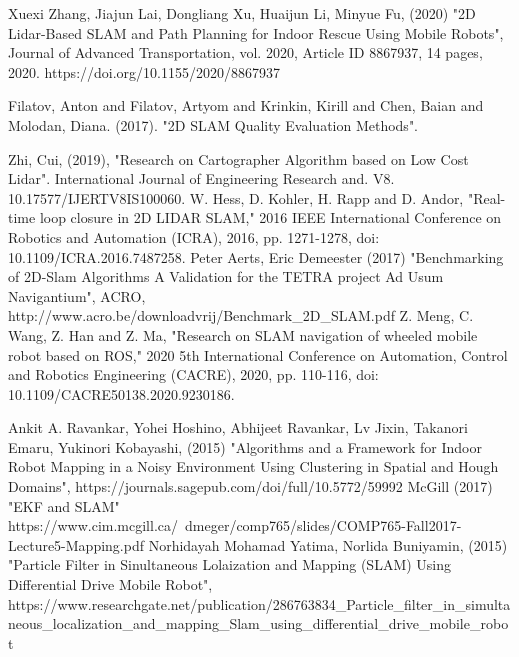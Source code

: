 \documentclass[12pt, a4paper, onecolumn]{article}
\begin{document}
\newpage
\begin{thebibliography}{9}
Xuexi Zhang, Jiajun Lai, Dongliang Xu, Huaijun Li, Minyue Fu, (2020) "2D Lidar-Based SLAM and Path Planning for Indoor Rescue Using Mobile Robots", Journal of Advanced Transportation, vol. 2020, Article ID 8867937, 14 pages, 2020. https://doi.org/10.1155/2020/8867937

Filatov, Anton and Filatov, Artyom and Krinkin, Kirill and Chen, Baian and Molodan, Diana. (2017). "2D SLAM Quality Evaluation Methods". 

Zhi, Cui, (2019), "Research on Cartographer Algorithm based on Low Cost Lidar". International Journal of Engineering Research and. V8. 10.17577/IJERTV8IS100060. 
W. Hess, D. Kohler, H. Rapp and D. Andor, "Real-time loop closure in 2D LIDAR SLAM," 2016 IEEE International Conference on Robotics and Automation (ICRA), 2016, pp. 1271-1278, doi: 10.1109/ICRA.2016.7487258.
Peter Aerts, Eric Demeester (2017) "Benchmarking of 2D-Slam Algorithms
A Validation for the TETRA project Ad Usum Navigantium", ACRO, http://www.acro.be/downloadvrij/Benchmark{\_}2D{\_}SLAM.pdf
Z. Meng, C. Wang, Z. Han and Z. Ma, "Research on SLAM navigation of wheeled mobile robot based on ROS," 2020 5th International Conference on Automation, Control and Robotics Engineering (CACRE), 2020, pp. 110-116, doi: 10.1109/CACRE50138.2020.9230186.

  Ankit A. Ravankar, Yohei Hoshino, Abhijeet Ravankar, Lv Jixin, Takanori Emaru, Yukinori Kobayashi, (2015) "Algorithms and a Framework for Indoor Robot Mapping in a Noisy Environment Using Clustering in Spatial and Hough Domains", https://journals.sagepub.com/doi/full/10.5772/59992
  McGill (2017) "EKF and SLAM" https://www.cim.mcgill.ca/~dmeger/comp765/slides/COMP765-Fall2017-Lecture5-Mapping.pdf
  Norhidayah Mohamad Yatima, Norlida Buniyamin, (2015) "Particle Filter in Sinultaneous Lolaization and Mapping (SLAM) Using Differential Drive Mobile Robot", https://www.researchgate.net/publication/286763834{\_}Particle{\_}filter{\_}in{\_}simultaneous{\_}localization{\_}and{\_}mapping{\_}Slam{\_}using{\_}differential{\_}drive{\_}mobile{\_}robot
\end{thebibliography}
\end{document}
